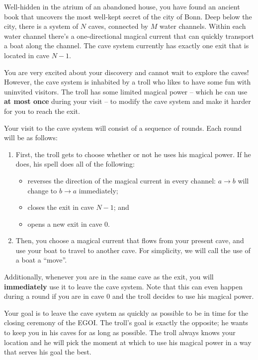
Well-hidden in the atrium of an abandoned house, you have found an ancient book that uncovers the most well-kept secret of the city of Bonn.
Deep below the city, there is a system of $N$ caves, connected by $M$ water channels.
Within each water channel there's a one-directional magical current that can quickly transport a boat along the channel.
The cave system currently has exactly one exit that is located in cave $N-1$.

You are very excited about your discovery and cannot wait to explore the caves! 
However, the cave system is inhabited by a troll who likes to have some fun with uninvited visitors. 
The troll has some limited magical power – which he can use \textbf{at most once} during your visit – to modify the cave system and make it harder for you to reach the exit.

Your visit to the cave system will consist of a sequence of rounds. Each round will be as follows:

\begin{enumerate}
\item First, the troll gets to choose whether or not he uses his magical power. If he does, his spell does all of the following:
	 \begin{itemize}
\item reverses the direction of the magical current in every channel: $a \rightarrow b$ will change to $b \rightarrow a$ immediately;
\item closes the exit in cave $N-1$; and
\item opens a new exit in cave $0$.
\end{itemize}
\item Then, you choose a magical current that flows from your present cave, and use your boat to travel to another cave. For simplicity, we will call the use of a boat a ``move''.
\end{enumerate}

Additionally, whenever you are in the same cave as the exit, you will \textbf{immediately} use it to leave the cave system. Note that this can even happen during a round if you are in cave $0$ and the troll decides to use his magical power.

Your goal is to leave the cave system as quickly as possible to be in time for the closing ceremony of the EGOI.
The troll's goal is exactly the opposite; he wants to keep you in his caves for as long as possible.
The troll always knows your location and he will pick the moment at which to use his magical power in a way that serves his goal the best.


